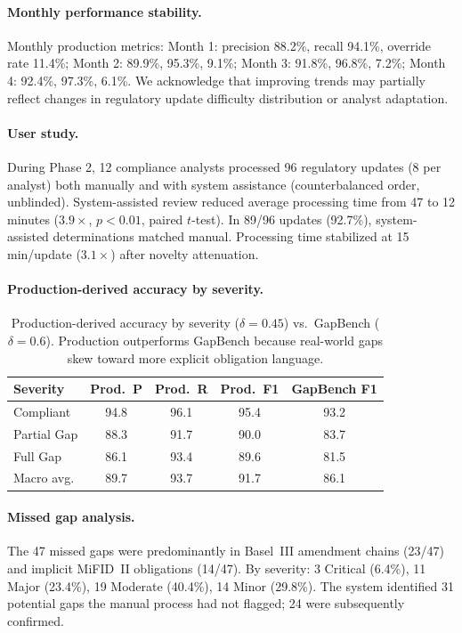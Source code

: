 \documentclass[11pt]{article}
\begin{document}
\paragraph{Monthly performance stability.} Monthly production metrics: Month 1: precision 88.2\%, recall 94.1\%, override rate 11.4\%; Month 2: 89.9\%, 95.3\%, 9.1\%; Month 3: 91.8\%, 96.8\%, 7.2\%; Month 4: 92.4\%, 97.3\%, 6.1\%. We acknowledge that improving trends may partially reflect changes in regulatory update difficulty distribution or analyst adaptation.

\paragraph{User study.} During Phase 2, 12 compliance analysts processed 96 regulatory updates (8 per analyst) both manually and with system assistance (counterbalanced order, unblinded). System-assisted review reduced average processing time from 47 to 12 minutes ($3.9\times$, $p{<}0.01$, paired $t$-test). In 89/96 updates (92.7\%), system-assisted determinations matched manual. Processing time stabilized at 15 min/update ($3.1\times$) after novelty attenuation.

\paragraph{Production-derived accuracy by severity.}
\begin{table}[h]
\centering
\small
\begin{tabular}{@{}lcccc@{}}
\toprule
\textbf{Severity} & \textbf{Prod.\ P} & \textbf{Prod.\ R} & \textbf{Prod.\ F1} & \textbf{GapBench F1} \\
\midrule
Compliant & 94.8 & 96.1 & 95.4 & 93.2 \\
Partial Gap & 88.3 & 91.7 & 90.0 & 83.7 \\
Full Gap & 86.1 & 93.4 & 89.6 & 81.5 \\
\midrule
Macro avg. & 89.7 & 93.7 & 91.7 & 86.1 \\
\bottomrule
\end{tabular}
\caption{Production-derived accuracy by severity ($\delta{=}0.45$) vs.\ GapBench ($\delta{=}0.6$). Production outperforms GapBench because real-world gaps skew toward more explicit obligation language.}
\label{tab:production_accuracy}
\end{table}

\paragraph{Missed gap analysis.} The 47 missed gaps were predominantly in Basel~III amendment chains (23/47) and implicit MiFID~II obligations (14/47). By severity: 3 Critical (6.4\%), 11 Major (23.4\%), 19 Moderate (40.4\%), 14 Minor (29.8\%). The system identified 31 potential gaps the manual process had not flagged; 24 were subsequently confirmed.
\end{document}
